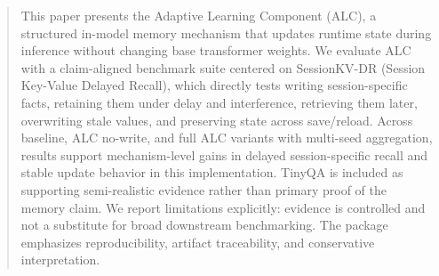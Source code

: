 \begin{abstract}
This paper presents the Adaptive Learning Component (ALC), a structured in-model memory mechanism that updates runtime state during inference without changing base transformer weights. We evaluate ALC with a claim-aligned benchmark suite centered on SessionKV-DR (Session Key-Value Delayed Recall), which directly tests writing session-specific facts, retaining them under delay and interference, retrieving them later, overwriting stale values, and preserving state across save/reload. Across baseline, ALC no-write, and full ALC variants with multi-seed aggregation, results support mechanism-level gains in delayed session-specific recall and stable update behavior in this implementation. TinyQA is included as supporting semi-realistic evidence rather than primary proof of the memory claim. We report limitations explicitly: evidence is controlled and not a substitute for broad downstream benchmarking. The package emphasizes reproducibility, artifact traceability, and conservative interpretation.
\end{abstract}

